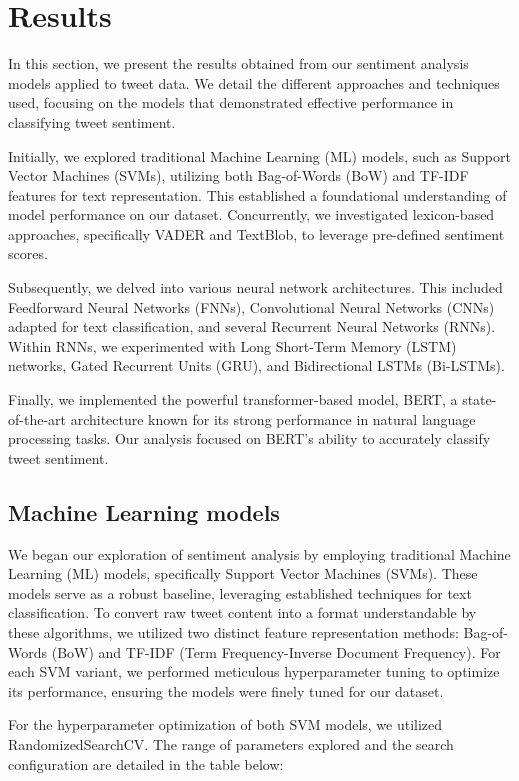\section{Results}
In this section, we present the results obtained from our sentiment analysis models applied to tweet data. We detail the different approaches and techniques used, focusing on the models that demonstrated effective performance in classifying tweet sentiment.

Initially, we explored traditional Machine Learning (ML) models, such as Support Vector Machines (SVMs), utilizing both Bag-of-Words (BoW) and TF-IDF features for text representation. This established a foundational understanding of model performance on our dataset. Concurrently, we investigated lexicon-based approaches, specifically VADER and TextBlob, to leverage pre-defined sentiment scores.

Subsequently, we delved into various neural network architectures. This included Feedforward Neural Networks (FNNs), Convolutional Neural Networks (CNNs) adapted for text classification, and several Recurrent Neural Networks (RNNs). Within RNNs, we experimented with Long Short-Term Memory (LSTM) networks, Gated Recurrent Units (GRU), and Bidirectional LSTMs (Bi-LSTMs).

Finally, we implemented the powerful transformer-based model, BERT, a state-of-the-art architecture known for its strong performance in natural language processing tasks. Our analysis focused on BERT's ability to accurately classify tweet sentiment.

\subsection{Machine Learning models}

We began our exploration of sentiment analysis by employing traditional Machine Learning (ML) models, specifically Support Vector Machines (SVMs). These models serve as a robust baseline, leveraging established techniques for text classification. To convert raw tweet content into a format understandable by these algorithms, we utilized two distinct feature representation methods: Bag-of-Words (BoW) and TF-IDF (Term Frequency-Inverse Document Frequency). For each SVM variant, we performed meticulous hyperparameter tuning to optimize its performance, ensuring the models were finely tuned for our dataset.

For the hyperparameter optimization of both SVM models, we utilized RandomizedSearchCV. The range of parameters explored and the search configuration are detailed in the table below:


